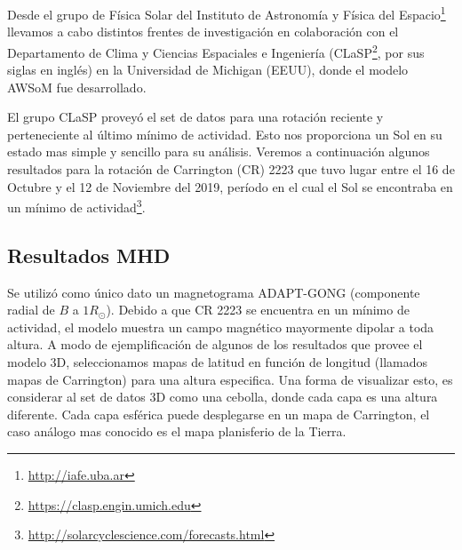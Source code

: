 \documentclass[a4paper,11pt]{report}
\begin{document}
Desde el grupo de Física Solar del Instituto de Astronomía y Física del Espacio\footnote{\url{http://iafe.uba.ar}} llevamos a cabo distintos frentes de investigación en colaboración con el Departamento de Clima y Ciencias Espaciales e Ingeniería (CLaSP\footnote{\url{https://clasp.engin.umich.edu}}, por sus siglas en inglés) en la Universidad de Michigan (EEUU), donde el modelo AWSoM fue desarrollado.

El grupo CLaSP proveyó el set de datos para una rotación reciente y perteneciente al último mínimo de actividad. Esto nos proporciona un Sol en su estado mas simple y sencillo para su análisis. Veremos a continuación algunos resultados para la rotación de Carrington (CR) 2223 que tuvo lugar entre el 16 de Octubre y el 12 de Noviembre del 2019, período en el cual el Sol se encontraba en un mínimo de actividad\footnote{\url{http://solarcyclescience.com/forecasts.html}}. 





\subsection{Resultados MHD}

Se utilizó como único dato un magnetograma ADAPT-GONG (componente radial de $B$ a $1R_{\odot}$). Debido a que CR 2223 se encuentra en un mínimo de actividad, el modelo muestra un campo magnético mayormente dipolar a toda altura. A modo de ejemplificación de algunos de los resultados que provee el modelo 3D, seleccionamos mapas de latitud en función de longitud (llamados mapas de Carrington) para una altura especifica. Una forma de visualizar esto, es considerar al set de datos 3D como una cebolla, donde cada capa es una altura diferente. Cada capa esférica puede desplegarse en un mapa de Carrington, el caso análogo mas conocido es el mapa planisferio de la Tierra.
\end{document}
